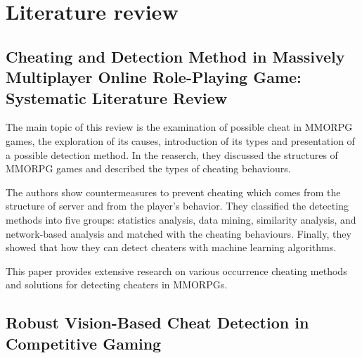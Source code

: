 \section{Literature review}
\label{ch:lit_rev}

\subsection{Cheating and Detection Method in Massively Multiplayer Online Role-Playing Game: Systematic Literature Review \cite{9766355}}

The main topic of this review is the examination of possible cheat in MMORPG games, the exploration of its causes, introduction of its types and presentation of a possible detection method.
In the reaserch, they discussed the structures of MMORPG games and described the types of cheating behaviours.

The authors show countermeasures to prevent cheating which comes from the structure of server and from the player's behavior.
They classified the detecting methods into five groups: statistics analysis, data mining, similarity analysis, and network-based analysis and matched with the cheating behaviours.
Finally, they showed that how they can detect cheaters with machine learning algorithms.

This paper provides extensive research on various occurrence cheating methods and solutions for detecting cheaters in MMORPGs.

\subsection{Robust Vision-Based Cheat Detection in Competitive Gaming \cite{jonnalagadda2021robust}}

